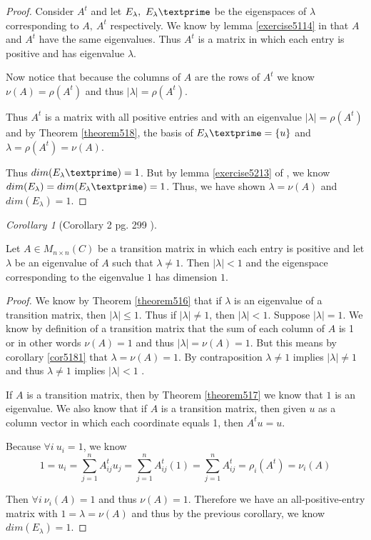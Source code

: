 \documentclass{amsart}
\theoremstyle{definition}
\theoremstyle{remark}
\newtheorem{corollary}{Corollary}[theorem]
\numberwithin{equation}{section}
\begin{document}
\begin{proof}

	Consider $A^t$ and let $E_{\lambda},\ E_{\lambda}\textprime$ be the eigenspaces of $\lambda$ corresponding to $A,\ A^t$ respectively.
	We know by lemma \ref{exercise5114} in \cite{friedberg2003linear} that $A$ and $A^t$ have the same eigenvalues.
	Thus $A^t$ is a matrix in which each entry is positive and has eigenvalue $\lambda$.

	Now notice that because the columns of $A$ are the rows of $A^t$ we know $\nu(A) = \rho(A^t)$ and thus $|\lambda| = \rho(A^t)$.


	Thus $A^t$ is a matrix with all positive entries and with an eigenvalue $|\lambda| = \rho(A^t)$ and by Theorem \ref{theorem518}, the basis of $E_{\lambda}\textprime = \{ u \}$ and $\lambda = \rho(A^t) = \nu(A)$.
	
	Thus $dim(E_{\lambda}\textprime) = 1$.
	But by lemma \ref{exercise5213} of \cite{friedberg2003linear}, we know $dim(E_{\lambda}) = dim(E_{\lambda}\textprime) = 1$.
	Thus, we have shown $\lambda = \nu(A)$ and $dim(E_{\lambda}) = 1$.

\end{proof}



\begin{corollary}[Corollary 2 pg. 299 \cite{friedberg2003linear}]\label{cor5182}

	Let $A \in M_{n \times n}(C)$ be a transition matrix in which each entry is positive and let $\lambda$ be an eigenvalue of $A$ such that $\lambda \neq 1$.
	Then  $|\lambda| < 1$ and the eigenspace corresponding to the eigenvalue $1$ has dimension $1$.

\end{corollary}

\begin{proof}
	We know by Theorem \ref{theorem516} that if $\lambda$ is an eigenvalue of a transition matrix, then $|\lambda| \leq 1$.
	Thus if $|\lambda| \neq 1$, then $|\lambda| < 1$.
	Suppose $|\lambda| = 1$.
	We know by definition of a transition matrix that the sum of each column of $A$ is 1 or in other words $\nu(A) = 1$ and thus $|\lambda| = \nu(A) = 1$.
	But this means by corollary \ref{cor5181} that $\lambda = \nu(A) = 1$.
	By contraposition $\lambda \neq 1$ implies $|\lambda| \neq  1$ and thus $\lambda \neq 1$ implies $|\lambda| <  1$ .

	If $A$ is a transition matrix, then by Theorem \ref{theorem517} we know that $1$ is an eigenvalue. 
	We also know that if $A$ is a transition matrix, then given $u$ as a column vector in which each coordinate equals 1, then $A^tu = u$.

	Because $\forall i\ u_i = 1$, we know
	 $$1 = u_i = \sum_{j = 1}^nA^t_{ij}u_j = \sum_{j = 1}^nA^t_{ij}(1) =  \sum_{j = 1}^nA^t_{ij} = \rho_i(A^t) = \nu_i(A)$$

	Then $\forall i\ \nu_i(A) = 1$ and thus $\nu(A) = 1$.
	Therefore we have an all-positive-entry matrix with $1 = \lambda = \nu(A) $ and thus by the previous corollary, we know $dim(E_{\lambda}) = 1$.


\end{proof}
\end{document}
